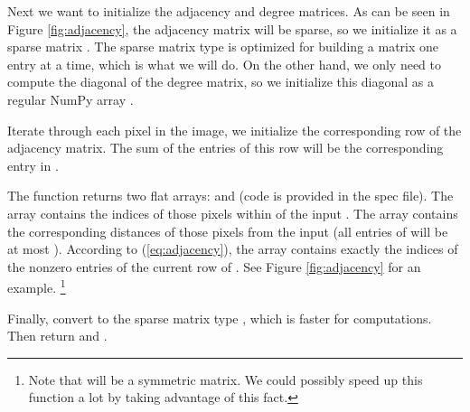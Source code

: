 Next we want to initialize the adjacency and degree matrices. As can be seen in Figure \ref{fig:adjacency}, the adjacency matrix will be sparse, so we initialize it as a sparse matrix . The sparse matrix type  is optimized for building a matrix one entry at a time, which is what we will do. On the other hand, we only need to compute the diagonal of the degree matrix, so we initialize this diagonal as a regular NumPy array .

Iterate through each pixel in the image, we initialize the corresponding row of the adjacency matrix.
The sum of the entries of this row will be the corresponding entry in . 

The function  returns two flat arrays:  and  (code is provided in the spec file). The array  contains the indices of those pixels within  of the input . The array  contains the corresponding distances of those pixels from the input  (all entries of  will be at most ). According to (\ref{eq:adjacency}), the array  contains exactly the indices of the nonzero entries of the current row of .  See Figure \ref{fig:adjacency} for an example. \footnote{Note that  will be a symmetric matrix. We could possibly speed up this function a lot by taking advantage of this fact.}

Finally, convert  to the sparse matrix type , which is faster for computations. Then return  and .

